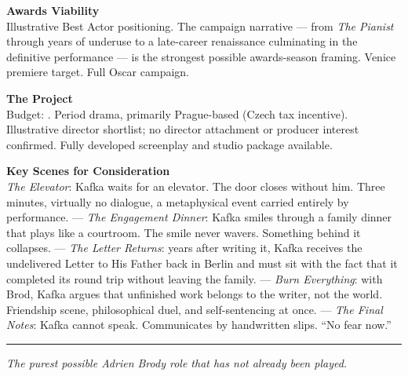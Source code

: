 \documentclass[11pt,letterpaper]{article}
\begin{document}
\vspace{2pt}

\textbf{Awards Viability}\\
Illustrative Best Actor positioning. The campaign narrative --- from \textit{The Pianist} through years of underuse to a late-career renaissance culminating in the definitive performance --- is the strongest possible awards-season framing. Venice premiere target. Full Oscar campaign.

\vspace{2pt}

\textbf{The Project}\\
Budget: \filmbudgetrange. Period drama, primarily Prague-based (Czech tax incentive). Illustrative director shortlist; no director attachment or producer interest confirmed. Fully developed screenplay and studio package available.

\vspace{2pt}

\textbf{Key Scenes for Consideration}\\
\textit{The Elevator}: Kafka waits for an elevator. The door closes without him. Three minutes, virtually no dialogue, a metaphysical event carried entirely by performance. --- \textit{The Engagement Dinner}: Kafka smiles through a family dinner that plays like a courtroom. The smile never wavers. Something behind it collapses. --- \textit{The Letter Returns}: years after writing it, Kafka receives the undelivered Letter to His Father back in Berlin and must sit with the fact that it completed its round trip without leaving the family. --- \textit{Burn Everything}: with Brod, Kafka argues that unfinished work belongs to the writer, not the world. Friendship scene, philosophical duel, and self-sentencing at once. --- \textit{The Final Notes}: Kafka cannot speak. Communicates by handwritten slips. ``No fear now.''

\vspace{4pt}
\textcolor{sectionrule}{\rule{\textwidth}{0.5pt}}
\vspace{2pt}
\begin{center}
{\small\color{kafkalight}\textit{The purest possible Adrien Brody role that has not already been played.}}
\end{center}
\end{document}
